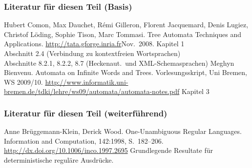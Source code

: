     \begin{frame}
      \frametitle{Literatur für diesen Teil (Basis)}
      \begin{small}
        \begin{thebibliography}{99}
            Hubert Comon, Max Dauchet, R\'emi Gilleron,
            Florent Jacquemard, Denis Lugiez, Christof L\"oding, Sophie Tison, Marc Tommasi.
            \newblock
            Tree Automata Techniques and Applications.
            \newblock
            \url{http://tata.gforge.inria.fr}\quad Nov.\ 2008.
            \newblock
            Kapitel 1\\
            Abschnitt 2.4 (Verbindung zu kontextfreien Wortsprachen)\\
            Abschnitte 8.2.1, 8.2.2, 8.7 (Heckenaut.\ und XML-Schemasprachen)
            Meghyn Bienvenu.
            \newblock
            Automata on Infinite Words and Trees.
            \newblock
            Vorlesungsskript, Uni Bremen, WS 2009/10.
            \newblock
            \url{http://www.informatik.uni-bremen.de/tdki/lehre/ws09/automata/automata-notes.pdf}
            \newblock
            Kapitel 3
        \end{thebibliography}
        \par
      \end{small}

      \note{~}
    \end{frame}

    \begin{frame}
      \frametitle{Literatur für diesen Teil (weiterführend)}
      \begin{small}
        \begin{thebibliography}{99}
            Anne Br{\"u}ggemann-Klein, Derick Wood.
            \newblock
            One-Unambiguous Regular Languages.
            \newblock
            Information and Computation, 142:1998, S.\ 182--206.
            \newblock
            \url{http://dx.doi.org/10.1006/inco.1997.2695}
            \newblock
            Grundlegende Resultate für deterministische reguläre Ausdrücke.          
        \end{thebibliography}
        \par
      \end{small}

      \note{~}
    \end{frame}

